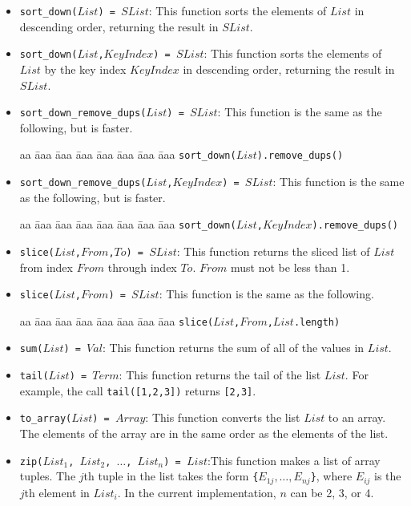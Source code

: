 \begin{itemize}
\item \texttt{sort\_down($List$) = $SList$}: This function sorts the elements of $List$ in descending order, returning the result in $SList$.

\item \texttt{sort\_down($List$,$KeyIndex$) = $SList$}: This function sorts the elements of $List$ by the key index $KeyIndex$ in descending order, returning the result in $SList$.

\item \texttt{sort\_down\_remove\_dups($List$) = $SList$}: This function is the same as the following, but is faster.
\begin{tabbing}
aa \= aaa \= aaa \= aaa \=aaa \= aaa \= aaa \= aaa \kill
\> \texttt{sort\_down($List$).remove\_dups()}
\end{tabbing}

\item \texttt{sort\_down\_remove\_dups($List$,$KeyIndex$) = $SList$}: This function is the same as the following, but is faster.
\begin{tabbing}
aa \= aaa \= aaa \= aaa \=aaa \= aaa \= aaa \= aaa \kill
\> \texttt{sort\_down($List$,$KeyIndex$).remove\_dups()}
\end{tabbing}

\item \texttt{slice($List$,$From$,$To$) = $SList$}: This function returns the sliced list of $List$ from index $From$ through index $To$. $From$ must not be less than 1. 

\item \texttt{slice($List$,$From$) = $SList$}: This function is the same as the following.
\begin{tabbing}
aa \= aaa \= aaa \= aaa \=aaa \= aaa \= aaa \= aaa \kill
\> \texttt{slice($List$,$From$,$List$.length)}
\end{tabbing}

\item \texttt{sum($List$) = $Val$}: This function returns the sum of all of the values in $List$. 
\item \texttt{tail($List$) = $Term$}: This function returns the tail of the list $List$.  For example, the call \texttt{tail([1,2,3])} returns \texttt{[2,3]}.
\item \texttt{to\_array($List$) = $Array$}: This function converts the list $List$ to an array.  The elements of the array are in the same order as the elements of the list.
\item \texttt{zip($List_1$, $List_2$, $\ldots$, $List_n$) = $List$}:This function makes a list of array tuples.  The $j$th tuple in the list takes the form \texttt{\{$E_{1j},\ldots,E_{nj}$\}}, where $E_{ij}$ is the $j$th element in $List_i$. In the current implementation, $n$ can be 2, 3, or 4.

\end{itemize}

